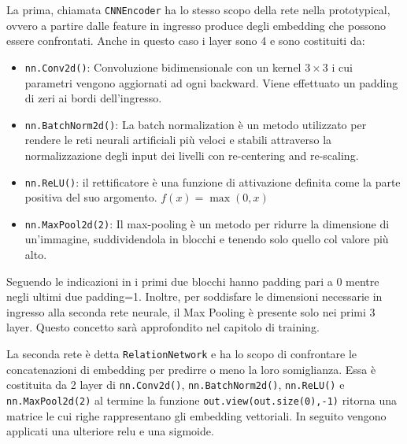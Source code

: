 \documentclass[12pt,a4paper,titlepage]{article}
\begin{document}
La prima, chiamata \texttt{CNNEncoder} ha lo stesso scopo della rete nella prototypical, ovvero a partire dalle feature in ingresso produce degli embedding che possono essere confrontati.
Anche in questo caso i layer sono 4 e sono costituiti da:
\begin{itemize}
	\item \texttt{nn.Conv2d()}: Convoluzione bidimensionale con un kernel $3 \times 3$ i cui parametri vengono aggiornati ad ogni backward. Viene effettuato un padding di zeri ai bordi dell'ingresso.
	\item \texttt{nn.BatchNorm2d()}: La batch normalization è un metodo utilizzato per rendere le reti neurali artificiali più veloci e stabili attraverso la normalizzazione degli input dei livelli con re-centering and re-scaling.
	\item \texttt{nn.ReLU()}: il rettificatore è una funzione di attivazione definita come la parte positiva del suo argomento. $f(x)=\max(0,x)$
	\item \texttt{nn.MaxPool2d(2)}: Il max-pooling è un metodo per ridurre la dimensione di un’immagine, suddividendola in blocchi e tenendo solo quello col valore più alto.
\end{itemize}
Seguendo le indicazioni in \cite{DBLP:journals/corr/abs-1711-06025} i primi due blocchi hanno padding pari a 0 mentre negli ultimi due padding=1.
Inoltre, per soddisfare le dimensioni necessarie in ingresso alla seconda rete neurale, il Max Pooling è presente solo nei primi 3 layer. Questo concetto sarà approfondito nel capitolo di training.

La seconda rete è detta \texttt{RelationNetwork} e ha lo scopo di confrontare le concatenazioni di embedding per predirre o meno la loro somiglianza.
Essa è costituita da 2 layer di \texttt{nn.Conv2d()}, \texttt{nn.BatchNorm2d()}, \texttt{nn.ReLU()} e \texttt{nn.MaxPool2d(2)} al termine la funzione \texttt{out.view(out.size(0),-1)} ritorna una matrice le cui righe rappresentano gli embedding vettoriali.
In seguito vengono applicati una ulteriore relu e una sigmoide.
\end{document}
